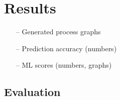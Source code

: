\documentclass[english,12pt,a4paper,pdftex,sci,utf8]{aaltothesis}
\begin{document}



\clearpage
\section{Results}
\label{sec:results}


\begin{itemize}
\item[--]Generated process graphs
\item[--]Prediction accuracy (numbers)
\item[--]ML scores (numbers, graphs)
\end{itemize}

\subsection{Evaluation}
\label{sec:evaluation}



\end{document}
